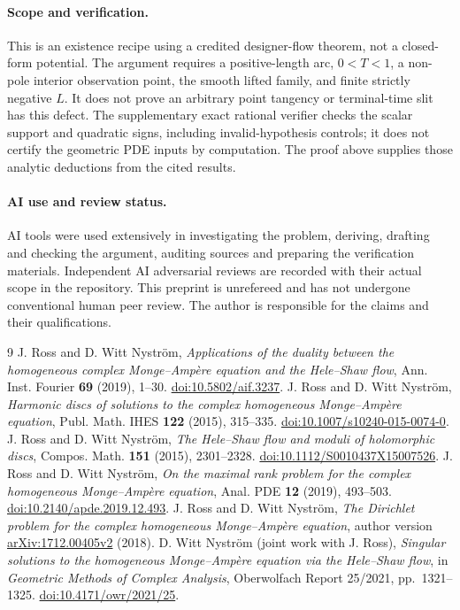\documentclass[11pt]{article}
\begin{document}
\paragraph{Scope and verification.}
This is an existence recipe using a credited designer-flow theorem,
not a closed-form potential. The argument requires a positive-length arc,
$0<T<1$, a non-pole interior observation point, the smooth lifted family,
and finite strictly negative $L$. It does not prove an arbitrary point
tangency or terminal-time slit has this defect. The supplementary exact
rational verifier checks the scalar support and quadratic signs, including
invalid-hypothesis controls; it does not certify the geometric PDE inputs
by computation. The proof above supplies those analytic deductions from
the cited results.

\paragraph{AI use and review status.}
AI tools were used extensively in investigating the problem, deriving,
drafting and checking the argument, auditing sources and preparing the
verification materials. Independent AI adversarial reviews are recorded
with their actual scope in the repository. This preprint is unrefereed and
has not undergone conventional human peer review. The author is responsible
for the claims and their qualifications.

\begin{thebibliography}{9}
 J. Ross and D. Witt Nystr\"om,
\emph{Applications of the duality between the homogeneous complex
Monge--Amp\`ere equation and the Hele--Shaw flow},
Ann. Inst. Fourier \textbf{69} (2019), 1--30.
\href{https://doi.org/10.5802/aif.3237}{doi:10.5802/aif.3237}.
 J. Ross and D. Witt Nystr\"om,
\emph{Harmonic discs of solutions to the complex homogeneous
Monge--Amp\`ere equation}, Publ. Math. IHES \textbf{122} (2015), 315--335.
\href{https://doi.org/10.1007/s10240-015-0074-0}{doi:10.1007/s10240-015-0074-0}.
 J. Ross and D. Witt Nystr\"om,
\emph{The Hele--Shaw flow and moduli of holomorphic discs},
Compos. Math. \textbf{151} (2015), 2301--2328.
\href{https://doi.org/10.1112/S0010437X15007526}{doi:10.1112/S0010437X15007526}.
 J. Ross and D. Witt Nystr\"om,
\emph{On the maximal rank problem for the complex homogeneous
Monge--Amp\`ere equation}, Anal. PDE \textbf{12} (2019), 493--503.
\href{https://doi.org/10.2140/apde.2019.12.493}{doi:10.2140/apde.2019.12.493}.
 J. Ross and D. Witt Nystr\"om,
\emph{The Dirichlet problem for the complex homogeneous Monge--Amp\`ere
equation}, author version
\href{https://arxiv.org/abs/1712.00405v2}{arXiv:1712.00405v2} (2018).
 D. Witt Nystr\"om (joint work with J. Ross),
\emph{Singular solutions to the homogeneous Monge--Amp\`ere equation via
the Hele--Shaw flow}, in \emph{Geometric Methods of Complex Analysis},
Oberwolfach Report 25/2021, pp.~1321--1325.
\href{https://doi.org/10.4171/owr/2021/25}{doi:10.4171/owr/2021/25}.
\end{thebibliography}
\end{document}
